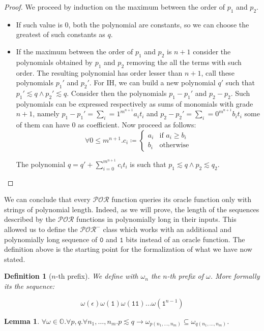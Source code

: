 \documentclass[10pt]{amsart}
\newcommand{\POR}{\mathcal{POR}}
\newcommand{\zero}{\mathtt{0}}
\newcommand{\one}{\mathtt{1}}
\newcommand{\OO}{\mathbb{O}}
\newcommand{\oone}{\omega}
\newtheorem{defn}{Definition}
\newtheorem{lemma}{Lemma}
\begin{document}
\begin{proof}
We proceed by induction on the maximum between the order of $p_1$ and $p_2$.
\begin{itemize}
\item If such value is $0$, both the polynomial are constants, so we can choose the greatest of such constants as $q$.
\item If the maximum between the order of $p_1$ and $p_2$ is $n+1$ consider the polynomials obtained by $p_1$ and $p_2$ removing the all the terms with such order. The resulting polynomial has order lesser than $n+1$, call these polynomials $p_1'$ and $p_2'$. For IH, we can build a new polynomial $q'$ such that $p_1' \lesssim q \land p_2' \lesssim q$. Consider then the polynomials $p_1-p_1'$ and $p_2-p_2$. Such polynomials can be expressed respectively as sums of monomials with grade $n+1$, namely $p_1-p_1' = \sum_i=1^{m^{n+1}} a_i t_i$ and $p_2-p_2' = \sum_i=0^{m^{n+1}} b_i t_i$ some of them can have $0$ as coefficient. Now proceed as follows:
\[
\forall 0 \le m^{n+1}. c_i \coloneqq \begin{cases} a_i & \text{if } a_i \ge b_i  \\ b_i & \text{otherwise} \end{cases}
\]

The polynomial $q = q' + \sum_{i=0}^{m^{n+1}}c_it_i$ is such that $p_1 \lesssim q \land p_2 \lesssim q_2$.
\end{itemize}
\end{proof}

We can conclude that every $\POR$ function queries its oracle function only with strings of polynomial length. Indeed, as we will prove, the length of the sequences described by the $\POR$ functions in polynomially long in their inputs. This allowed us to define the $\POR^-$ class which works with an additional and polynomially long sequence of $\zero$ and $\one$ bits instead of an oracle function. The definition above is the starting point for the formalization of what we have now stated.

\begin{defn}[$n$-th prefix]
We define with $\oone_n$ the $n$-th prefix of $\oone$. More formally its the sequence:

\[
\oone(\epsilon)\oone(\one)\oone(\one \one)\ldots \oone(\one^{n-1})
\]
\end{defn}

\begin{lemma}
\label{lemma:oracleprefix}
$\forall \oone \in \OO.\forall p, q.\forall n_1, \ldots, n_m. p \lesssim q \to \oone_{p(n_1, \ldots, n_m)}\subseteq  \oone_{q(n_1, \ldots, n_m)}$.
\end{lemma}
\end{document}

